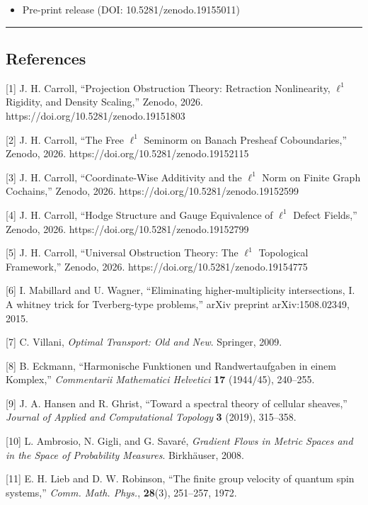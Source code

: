 \documentclass[
]{article}
\providecommand{\tightlist}{%
  \setlength{\itemsep}{0pt}\setlength{\parskip}{0pt}}
\begin{document}
\begin{itemize}
\tightlist
\item
  Pre-print release (DOI: 10.5281/zenodo.19155011)
\end{itemize}

\begin{center}\rule{0.5\linewidth}{0.5pt}\end{center}

\subsection{References}\label{references}

{[}1{]} J. H. Carroll, ``Projection Obstruction Theory: Retraction
Nonlinearity, \(\ell^1\) Rigidity, and Density Scaling,'' Zenodo, 2026.
https://doi.org/10.5281/zenodo.19151803

{[}2{]} J. H. Carroll, ``The Free \(\ell^1\) Seminorm on Banach Presheaf
Coboundaries,'' Zenodo, 2026. https://doi.org/10.5281/zenodo.19152115

{[}3{]} J. H. Carroll, ``Coordinate-Wise Additivity and the \(\ell^1\)
Norm on Finite Graph Cochains,'' Zenodo, 2026.
https://doi.org/10.5281/zenodo.19152599

{[}4{]} J. H. Carroll, ``Hodge Structure and Gauge Equivalence of
\(\ell^1\) Defect Fields,'' Zenodo, 2026.
https://doi.org/10.5281/zenodo.19152799

{[}5{]} J. H. Carroll, ``Universal Obstruction Theory: The \(\ell^1\)
Topological Framework,'' Zenodo, 2026.
https://doi.org/10.5281/zenodo.19154775

{[}6{]} I. Mabillard and U. Wagner, ``Eliminating higher-multiplicity
intersections, I. A whitney trick for Tverberg-type problems,'' arXiv
preprint arXiv:1508.02349, 2015.

{[}7{]} C. Villani, \emph{Optimal Transport: Old and New}. Springer,
2009.

{[}8{]} B. Eckmann, ``Harmonische Funktionen und Randwertaufgaben in
einem Komplex,'' \emph{Commentarii Mathematici Helvetici} \textbf{17}
(1944/45), 240--255.

{[}9{]} J. A. Hansen and R. Ghrist, ``Toward a spectral theory of
cellular sheaves,'' \emph{Journal of Applied and Computational Topology}
\textbf{3} (2019), 315--358.

{[}10{]} L. Ambrosio, N. Gigli, and G. Savaré, \emph{Gradient Flows in
Metric Spaces and in the Space of Probability Measures}. Birkhäuser,
2008.

{[}11{]} E. H. Lieb and D. W. Robinson, ``The finite group velocity of
quantum spin systems,'' \emph{Comm. Math. Phys.}, \textbf{28}(3),
251--257, 1972.
\end{document}
